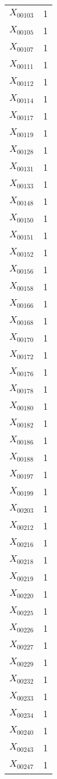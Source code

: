\documentclass[a4paper,10pt]{article}
\begin{document}
\begin{center}
\begin{longtable}{cc}
$X_{00103}$ & 1 \\
$X_{00105}$ & 1 \\
$X_{00107}$ & 1 \\
$X_{00111}$ & 1 \\
$X_{00112}$ & 1 \\
$X_{00114}$ & 1 \\
$X_{00117}$ & 1 \\
$X_{00119}$ & 1 \\
$X_{00128}$ & 1 \\
$X_{00131}$ & 1 \\
$X_{00133}$ & 1 \\
$X_{00148}$ & 1 \\
$X_{00150}$ & 1 \\
$X_{00151}$ & 1 \\
$X_{00152}$ & 1 \\
$X_{00156}$ & 1 \\
$X_{00158}$ & 1 \\
$X_{00166}$ & 1 \\
$X_{00168}$ & 1 \\
$X_{00170}$ & 1 \\
$X_{00172}$ & 1 \\
$X_{00176}$ & 1 \\
$X_{00178}$ & 1 \\
$X_{00180}$ & 1 \\
$X_{00182}$ & 1 \\
$X_{00186}$ & 1 \\
$X_{00188}$ & 1 \\
$X_{00197}$ & 1 \\
$X_{00199}$ & 1 \\
$X_{00203}$ & 1 \\
$X_{00212}$ & 1 \\
$X_{00216}$ & 1 \\
$X_{00218}$ & 1 \\
$X_{00219}$ & 1 \\
$X_{00220}$ & 1 \\
$X_{00225}$ & 1 \\
$X_{00226}$ & 1 \\
$X_{00227}$ & 1 \\
$X_{00229}$ & 1 \\
$X_{00232}$ & 1 \\
$X_{00233}$ & 1 \\
$X_{00234}$ & 1 \\
$X_{00240}$ & 1 \\
$X_{00243}$ & 1 \\
$X_{00247}$ & 1 \\

\end{longtable}
\end{center}
\end{document}
